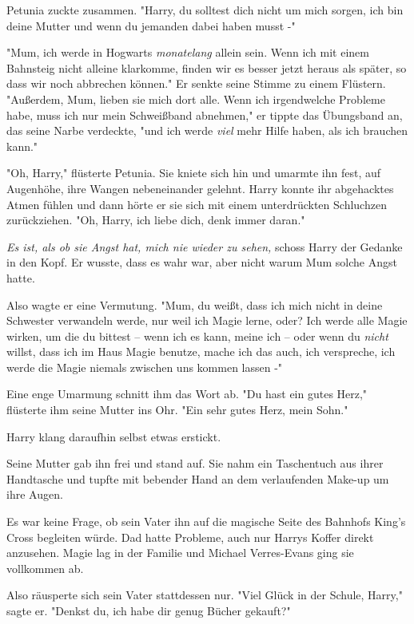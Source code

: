 {Petunia zuckte zusammen. "Harry, du solltest dich nicht um mich sorgen, ich bin deine Mutter und wenn du jemanden dabei haben musst -"

"Mum, ich werde in Hogwarts \emph{monatelang} allein sein. Wenn ich mit einem Bahnsteig nicht alleine klarkomme, finden wir es besser jetzt heraus als später, so dass wir noch abbrechen können." Er senkte seine Stimme zu einem Flüstern. "Außerdem, Mum, lieben sie mich dort alle. Wenn ich irgendwelche Probleme habe, muss ich nur mein Schweißband abnehmen," er tippte das Übungsband an, das seine Narbe verdeckte, "und ich werde \emph{viel} mehr Hilfe haben, als ich brauchen kann."

"Oh, Harry," flüsterte Petunia. Sie kniete sich hin und umarmte ihn fest, auf Augenhöhe, ihre Wangen nebeneinander gelehnt. Harry konnte ihr abgehacktes Atmen fühlen und dann hörte er sie sich mit einem unterdrückten Schluchzen zurückziehen. "Oh, Harry, ich liebe dich, denk immer daran."

\emph{Es ist, als ob sie Angst hat, mich nie wieder zu sehen,} schoss Harry der Gedanke in den Kopf. Er wusste, dass es wahr war, aber nicht warum Mum solche Angst hatte.

Also wagte er eine Vermutung. "Mum, du weißt, dass ich mich nicht in deine Schwester verwandeln werde, nur weil ich Magie lerne, oder? Ich werde alle Magie wirken, um die du bittest -- wenn ich es kann, meine ich -- oder wenn du \emph{nicht} willst, dass ich im Haus Magie benutze, mache ich das auch, ich verspreche, ich werde die Magie niemals zwischen uns kommen lassen -"

Eine enge Umarmung schnitt ihm das Wort ab. "Du hast ein gutes Herz," flüsterte ihm seine Mutter ins Ohr. "Ein sehr gutes Herz, mein Sohn."

Harry klang daraufhin selbst etwas erstickt.

Seine Mutter gab ihn frei und stand auf. Sie nahm ein Taschentuch aus ihrer Handtasche und tupfte mit bebender Hand an dem verlaufenden Make-up um ihre Augen.

Es war keine Frage, ob sein Vater ihn auf die magische Seite des Bahnhofs King's Cross begleiten würde. Dad hatte Probleme, auch nur Harrys Koffer direkt anzusehen. Magie lag in der Familie und Michael Verres-Evans ging sie vollkommen ab.

Also räusperte sich sein Vater stattdessen nur. "Viel Glück in der Schule, Harry," sagte er. "Denkst du, ich habe dir genug Bücher gekauft?"

}
